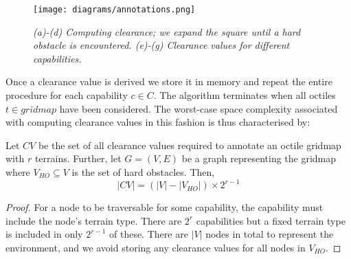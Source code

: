 \begin{figure}[htbp]
	\vspace{-9pt}
       \caption{\emph{(a)-(d) Computing clearance; we expand the square until a hard obstacle is encountered. (e)-(g) Clearance values for different capabilities.} \vspace{0.5em}}
       \begin{center}
                       \texttt{[image: diagrams/annotations.png]}
       \end{center}
       \label{aha-fig:annotations}
	\vspace{-6pt}
\end{figure}

Once a clearance value is derived we store it in memory and repeat the entire procedure for each capability $c \in C$.  
The algorithm terminates when all octiles $t \in gridmap$ have been considered. 
The worst-case space complexity associated with computing clearance values in this fashion is thus characterised by: 
\begin{lemma}
\label{aha-lemma:numannotations}
Let $CV$ be the set of all clearance values required to annotate an octile gridmap with $r$ terrains. Further, let $G = (V, E)$ be a graph representing the gridmap where $V_{HO} \subseteq V$ is the set of hard obstacles. Then, 
$$|CV| = (|V| - |V_{HO}|)\times 2^{r-1}$$
\end{lemma}

\begin{proof}
For a node to be traversable for some capability, the capability must include the node's terrain type. 
There are $2^{r}$ capabilities but a fixed terrain type is included in only $2^{r-1}$ of these. 
There are $|V|$ nodes in total to represent the environment, and we avoid storing any clearance values for all nodes in $V_{HO}$. 
\end{proof}

